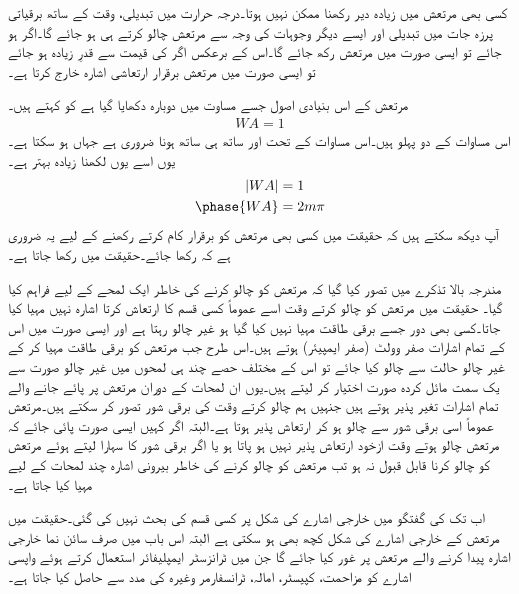 کسی بھی مرتعش میں زیادہ دیر   رکھنا ممکن نہیں ہوتا۔درجہ حرارت میں تبدیلی، وقت کے ساتھ برقیاتی پرزہ جات میں تبدیلی اور ایسے دیگر  وجوہات کی وجہ سے  مرتعش چالو کرتے ہی  ہو جائے گا۔اگر   ہو جائے تو ایسی صورت میں مرتعش رکھ جائے گا۔اس کے برعکس اگر  کی قیمت   سے قدرِ زیادہ ہو جائے تو ایسی صورت میں مرتعش برقرار ارتعاشی اشارہ خارج کرتا ہے۔

مرتعش کے اس بنیادی اصول جسے مساوت  میں دوبارہ دکھایا گیا ہے کو  کہتے ہیں۔
\begin{align} \label{مساوات_برکہازن_کا_اصول}
WA =1
\end{align}
اس مساوات کے دو پہلو ہیں۔اس مساوات کے تحت  اور ساتھ ہی ساتھ  ہونا ضروری ہے جہاں   ہو سکتا ہے۔یوں اسے یوں لکھنا زیادہ بہتر ہے۔
\begin{align} \label{مساوات_برکہازن_کا_اصول_الف}
\abs{WA} &=\num{1}\\
\phase{WA} &=2m \pi 
\end{align}
آپ دیکھ سکتے ہیں کہ حقیقت میں کسی بھی مرتعش کو برقرار کام کرتے رکھنے کے لیے یہ ضروری ہے کہ   رکھا جائے۔حقیقت میں
  رکھا جاتا ہے۔
 
مندرجہ بالا تذکرے میں تصور کیا گیا کہ مرتعش کو چالو کرنے کی خاطر ایک لمحے کے لیے  فراہم کیا گیا۔ حقیقت میں مرتعش کو چالو کرتے وقت اسے عموماً کسی قسم کا ارتعاش کرتا اشارہ نہیں مہیا کیا جاتا۔کسی بھی دور جسے برقی طاقت مہیا نہیں کیا گیا ہو غیر چالو رہتا ہے اور ایسی صورت  میں اس کے تمام اشارات صفر وولٹ (صفر ایمپیئر) ہوتے ہیں۔اس طرح جب مرتعش کو برقی طاقت مہیا کر کے غیر چالو حالت سے چالو کیا جائے تو اس کے مختلف حصے چند ہی لمحوں میں غیر چالو صورت سے یک سمت  مائل کردہ  صورت اختیار کر لیتے ہیں۔یوں ان لمحات کے دوران مرتعش پر پائے جانے والے تمام اشارات تغیر پذیر ہوتے ہیں جنہیں ہم چالو کرتے وقت کی برقی شور تصور کر سکتے ہیں۔مرتعش عموماً اسی برقی شور سے چالو ہو کر ارتعاش پذیر ہوتا ہے۔البتہ اگر کہیں ایسی صورت پائی جائے کہ مرتعش چالو ہوتے وقت ازخود ارتعاش پذیر نہیں ہو پاتا ہو یا اگر برقی شور کا سہارا لیتے ہوئے مرتعش کو چالو کرنا قابل قبول نہ ہو تب مرتعش کو چالو کرنے کی خاطر بیرونی اشارہ چند لمحات کے لیے مہیا کیا جاتا ہے۔ 

اب تک کی گفتگو میں خارجی اشارے کی شکل پر کسی قسم کی بحث نہیں کی گئی۔حقیقت میں مرتعش کے خارجی اشارے کی شکل کچھ بھی ہو سکتی ہے البتہ اس باب میں صرف سائن نما خارجی اشارہ پیدا کرنے والے مرتعش پر غور کیا جائے گا جن میں ٹرانزسٹر ایمپلیفائر  استعمال کرتے ہوئے واپسی اشارے کو مزاحمت، کپیسٹر، امالہ، ٹرانسفارمر وغیرہ کی مدد سے حاصل کیا جاتا ہے۔

